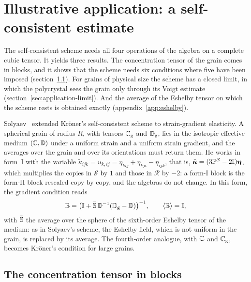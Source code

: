 \section{Illustrative application: a self-consistent estimate}\label{sec:application}

The self-consistent scheme needs all four operations of the algebra on a complete cubic
tensor. It yields three results. The concentration tensor of the grain comes in blocks,
and it shows that the scheme needs six conditions where five have been imposed
(section~\ref{sec:application-blocks}). For grains of physical size the scheme has a
closed limit, in which the polycrystal sees the grain only through its Voigt estimate
(section~\ref{sec:application-limit}). And the average of the Eshelby tensor on which the
scheme rests is obtained exactly (appendix~\ref{app:eshelby}).

Solyaev~\cite{Solyaev2023} extended Kr\"oner's self-consistent scheme to strain-gradient
elasticity. A spherical grain of radius $R$, with tensors $\mathbb{C}_{\mathrm{g}}$ and $\mathbb{D}_{\mathrm{g}}$, lies in
the isotropic effective medium $(\mathbb{C},\mathbb{D})$ under a uniform strain and a uniform strain
gradient, and the averages over the grain and over its orientations must return them. He
works in form~I with the variable $\tilde\kappa_{ijk}=u_{k,ij}=\eta_{kij}+\eta_{kji}-\eta_{ijk}$,
that is, $\tilde{\bm\kappa}=(3\mathbb{P}^{\mathcal S}-2\mathbb{I})\bm{\eta}$, which multiplies the copies in $\mathcal S$ by $1$ and those
in $\mathcal R$ by $-2$: a form-I block is the form-II block rescaled copy by copy, and the
algebras do not change. In this form, the gradient condition reads~\cite[eqs.~(7)
and~(10)]{Solyaev2023}
\begin{equation}
\mathbb{B}=\big(\mathbb{I}+\bar{\mathbb{S}}\,\mathbb{D}^{-1}(\mathbb{D}_{\mathrm{g}}-\mathbb{D})\big)^{-1},\qquad \langle \mathbb{B}\rangle=\mathbb{I},
\label{eq:sc-condition}
\end{equation}
with $\bar{\mathbb{S}}$ the average over the sphere of the sixth-order Eshelby tensor of the medium:
as in Solyaev's scheme, the Eshelby field, which is not uniform in the grain, is replaced
by its average. The fourth-order analogue, with $\mathbb{C}$ and $\mathbb{C}_{\mathrm{g}}$, becomes Kr\"oner's condition for
large grains.

\subsection{The concentration tensor in blocks}\label{sec:application-blocks}

